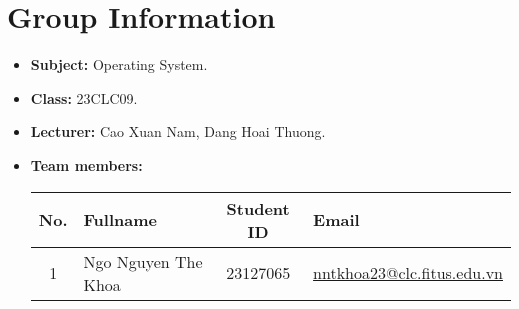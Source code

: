 \section{Group Information}
\begin{itemize}
  \item \textbf{Subject:} Operating System.
  \item \textbf{Class:} 23CLC09.
  \item \textbf{Lecturer:} Cao Xuan Nam, Dang Hoai Thuong.
  \item \textbf{Team members:}
        \begin{center}
          \renewcommand{\arraystretch}{1.5}
          \begin{tabular}{|c|l|c|l|}
            \hline
            \textbf{No.} & \textbf{Fullname}     & \textbf{Student ID} & \textbf{Email}                                                         \\\hline
            1            & Ngo Nguyen The Khoa   & 23127065            & \href{mailto:nntkhoa23@clc.fitus.edu.vn}{nntkhoa23@clc.fitus.edu.vn}   \\\hline
          \end{tabular}
        \end{center}
\end{itemize}
